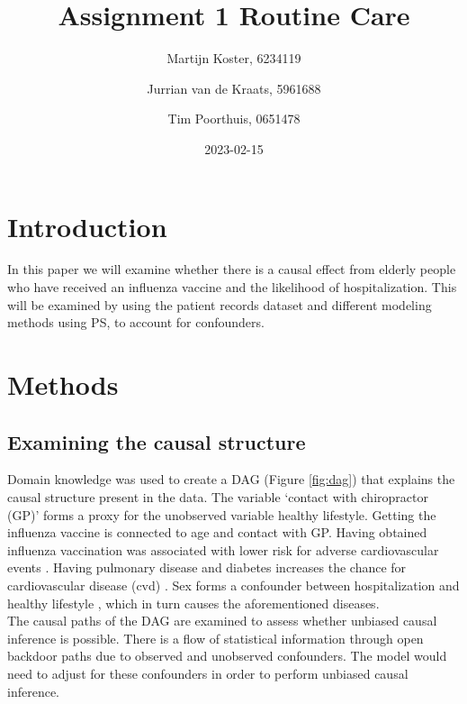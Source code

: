 \documentclass[
]{article}
\title{Assignment 1 Routine Care}
\author{Martijn Koster, 6234119 \and Jurrian van de Kraats, 5961688 \and Tim Poorthuis, 0651478}
\date{2023-02-15}
\begin{document}
\maketitle

\newpage

\hypertarget{introduction}{%
\section{Introduction}\label{introduction}}

In this paper we will examine whether there is a causal effect from elderly people who have received an influenza vaccine and the likelihood of hospitalization. This will be examined by using the patient records dataset and different modeling methods using PS, to account for confounders.

\hypertarget{methods}{%
\section{Methods}\label{methods}}

\hypertarget{examining-the-causal-structure}{%
\subsection{Examining the causal structure}\label{examining-the-causal-structure}}

Domain knowledge was used to create a DAG (Figure \ref{fig:dag}) that explains the causal structure present in the data. The variable `contact with chiropractor (GP)' forms a proxy for the unobserved variable healthy lifestyle. Getting the influenza vaccine is connected to age and contact with GP. Having obtained influenza vaccination was associated with lower risk for adverse cardiovascular events \citep{behrouzi}. Having pulmonary disease and diabetes increases the chance for cardiovascular disease (cvd) \citep{nhg}. Sex forms a confounder between hospitalization and healthy lifestyle \citep{loef}, which in turn causes the aforementioned diseases.\\
\hspace*{0.333em}\hspace*{0.333em}The causal paths of the DAG are examined to assess whether unbiased causal inference is possible. There is a flow of statistical information through open backdoor paths due to observed and unobserved confounders. The model would need to adjust for these confounders in order to perform unbiased causal inference.
\end{document}
